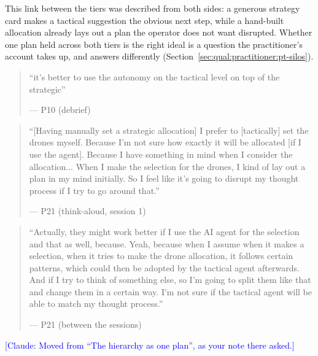 \label{sec:qual:hierarchy}\label{sec:qual:hierarchy:one-plan}
This link between the tiers was described from both sides: a generous strategy card makes a tactical suggestion the obvious next step, while a hand-built allocation already lays out a plan the operator does not want disrupted. Whether one plan held across both tiers is the right ideal is a question the practitioner's account takes up, and answers differently (Section~\ref{sec:qual:practitioner:pt-silos}).

\begin{quote}\small
``it's better to use the autonomy on the tactical level on top of the strategic''\par\hfill--- P10 (debrief)
\end{quote}

\begin{quote}\small
``[Having manually set a strategic allocation] I prefer to [tactically] set the drones myself. Because I'm not sure how exactly it will be allocated [if I use the agent]. Because I have something in mind when I consider the allocation... When I make the selection for the drones, I kind of lay out a plan in my mind initially. So I feel like it's going to disrupt my thought process if I try to go around that.''\par\hfill--- P21 (think-aloud, session 1)
\end{quote}

\begin{quote}\small
``Actually, they might work better if I use the AI agent for the selection and that as well, because. Yeah, because when I assume when it makes a selection, when it tries to make the drone allocation, it follows certain patterns, which could then be adopted by the tactical agent afterwards. And if I try to think of something else, so I'm going to split them like that and change them in a certain way. I'm not sure if the tactical agent will be able to match my thought process.''\par\hfill--- P21 (between the sessions)
\end{quote}
\textcolor{blue}{[Claude: Moved from ``The hierarchy as one plan'', as your note there asked.]}


